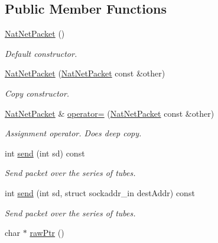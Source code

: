 \subsection*{\-Public \-Member \-Functions}
\begin{DoxyCompactItemize}
\item 
\hypertarget{classNatNetPacket_aa6da2fc5f50d6ed960333a7dbeee2c22}{\hyperlink{classNatNetPacket_aa6da2fc5f50d6ed960333a7dbeee2c22}{\-Nat\-Net\-Packet} ()}\label{classNatNetPacket_aa6da2fc5f50d6ed960333a7dbeee2c22}

\begin{DoxyCompactList}\small\item\em \-Default constructor. \end{DoxyCompactList}\item 
\hypertarget{classNatNetPacket_a1276bae8a1f3864764897747ee67b90c}{\hyperlink{classNatNetPacket_a1276bae8a1f3864764897747ee67b90c}{\-Nat\-Net\-Packet} (\hyperlink{classNatNetPacket}{\-Nat\-Net\-Packet} const \&other)}\label{classNatNetPacket_a1276bae8a1f3864764897747ee67b90c}

\begin{DoxyCompactList}\small\item\em \-Copy constructor. \end{DoxyCompactList}\item 
\hypertarget{classNatNetPacket_a25c409e7b0bc26ea11c978463fd49fa1}{\hyperlink{classNatNetPacket}{\-Nat\-Net\-Packet} \& \hyperlink{classNatNetPacket_a25c409e7b0bc26ea11c978463fd49fa1}{operator=} (\hyperlink{classNatNetPacket}{\-Nat\-Net\-Packet} const \&other)}\label{classNatNetPacket_a25c409e7b0bc26ea11c978463fd49fa1}

\begin{DoxyCompactList}\small\item\em \-Assignment operator. \-Does deep copy. \end{DoxyCompactList}\item 
int \hyperlink{classNatNetPacket_a64cec16e85c33bdfdef9372286fe2c6c}{send} (int sd) const 
\begin{DoxyCompactList}\small\item\em \-Send packet over the series of tubes. \end{DoxyCompactList}\item 
int \hyperlink{classNatNetPacket_a3660ddf6d4207e2fef9b76a780913d28}{send} (int sd, struct sockaddr\-\_\-in dest\-Addr) const 
\begin{DoxyCompactList}\small\item\em \-Send packet over the series of tubes. \end{DoxyCompactList}\item 
\hypertarget{classNatNetPacket_a01546982e21c1ecfff4a0bd2319b59e9}{char $\ast$ \hyperlink{classNatNetPacket_a01546982e21c1ecfff4a0bd2319b59e9}{raw\-Ptr} ()}\label{classNatNetPacket_a01546982e21c1ecfff4a0bd2319b59e9}


\end{DoxyCompactItemize}
